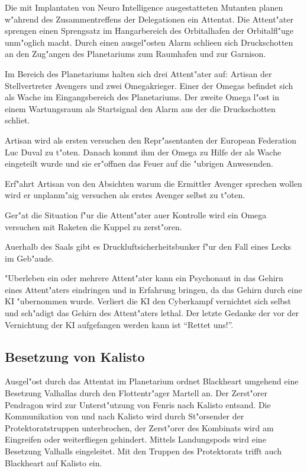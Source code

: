 Die mit Implantaten von Neuro Intelligence ausgestatteten Mutanten planen w"ahrend des Zusammentreffens der Delegationen ein Attentat. Die Attent"ater sprengen einen Sprengsatz im Hangarbereich des Orbitalhafen der Orbitalfl"uge unm"oglich macht. Durch einen ausgel"osten Alarm schlie\3en sich Druckschotten an den Zug"angen des Planetariums zum Raumhafen und zur Garnison.

Im Bereich des Planetariums halten sich drei Attent"ater auf: Artisan der Stellvertreter Avengers und zwei Omegakrieger. Einer der Omegas befindet sich als Wache im Eingangsbereich des Planetariums. Der zweite Omega l"ost in einem Wartungsraum als Startsignal den Alarm aus der die Druckschotten schlie\3t.

\begin{remarks}
Artisan wird als ersten versuchen den Repr"asentanten der European Federation Luc Duval zu t"oten. Danach kommt ihm der Omega zu Hilfe der als Wache eingeteilt wurde und sie er"offnen das Feuer auf die "ubrigen Anwesenden.

Erf"ahrt Artisan von den Absichten warum die Ermittler Avenger sprechen wollen wird er unplanm"a\3ig versuchen als erstes Avenger selbst zu t"oten.

Ger"at die Situation f"ur die Attent"ater au\3er Kontrolle wird ein Omega versuchen mit Raketen die Kuppel zu zerst"oren.

Au\3erhalb des Saals gibt es Druckluftsicherheitsbunker f"ur den Fall eines Lecks im Geb"aude.

"Uberleben ein oder mehrere Attent"ater kann ein Psychonaut in das Gehirn eines Attent"aters eindringen und in Erfahrung bringen, da\3 das Gehirn durch eine KI "ubernommen wurde. Verliert die KI den Cyberkampf vernichtet sich selbst und sch"adigt das Gehirn des Attent"aters lethal. Der letzte Gedanke der vor der Vernichtung der KI aufgefangen werden kann ist ``Rettet uns!''.
\end{remarks}

\subsection{Besetzung von Kalisto}

Ausgel"ost durch das Attentat im Planetarium ordnet Blackheart umgehend eine Besetzung Valhallas durch den Flottentr"ager Martell an. Der Zerst"orer Pendragon wird zur Unterst"utzung von Fenris nach Kalisto entsand. Die Kommunikation von und nach Kalisto wird durch St"orsender der Protektoratstruppen unterbrochen, der Zerst"orer des Kombinats wird am Eingreifen oder weiterfliegen gehindert. Mittels Landungspods wird eine Besetzung Valhalls eingeleitet. Mit den Truppen des Protektorats trifft auch Blackheart auf Kalisto ein.

